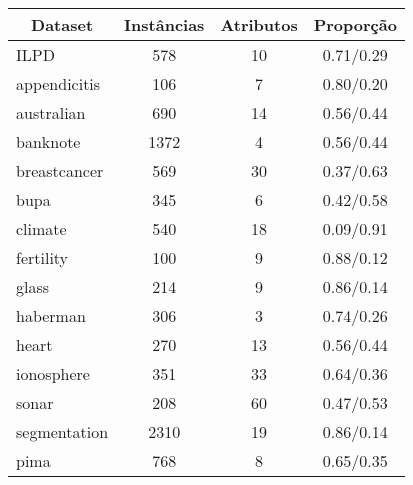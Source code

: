 \documentclass[conference]{IEEEtran}
\begin{document}
	\begin{table}[h!]
		\centering
		\label{tab:datasets}
		\begin{tabular}{|l|c|c|c|}
			\hline
			\multicolumn{1}{|c|}{\textbf{Dataset}} & \textbf{Instâncias} & \textbf{Atributos} & \textbf{Proporção} \\ \hline
			ILPD                                   & 578                 & 10                 & 0.71/0.29          \\ \hline
			appendicitis                           & 106                 & 7                  & 0.80/0.20          \\ \hline
			australian                             & 690                 & 14                 & 0.56/0.44          \\ \hline
			banknote                               & 1372                & 4                  & 0.56/0.44          \\ \hline
			breastcancer                           & 569                 & 30                 & 0.37/0.63          \\ \hline
			bupa                                   & 345                 & 6                  & 0.42/0.58          \\ \hline
			climate                                & 540                 & 18                 & 0.09/0.91          \\ \hline
			fertility                              & 100                 & 9                  & 0.88/0.12          \\ \hline
			glass                                  & 214                 & 9                  & 0.86/0.14          \\ \hline
			haberman                               & 306                 & 3                  & 0.74/0.26          \\ \hline
			heart                                  & 270                 & 13                 & 0.56/0.44          \\ \hline
			ionosphere                             & 351                 & 33                 & 0.64/0.36          \\ \hline
			sonar                                  & 208                 & 60                 & 0.47/0.53          \\ \hline
			segmentation                           & 2310                & 19                 & 0.86/0.14          \\ \hline
			pima                                   & 768                 & 8                  & 0.65/0.35          \\ \hline
		\end{tabular}
	\end{table}
\end{document}
